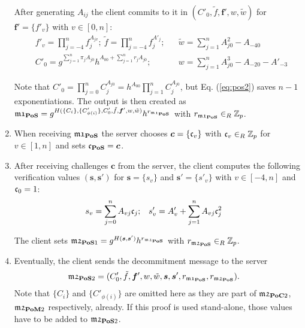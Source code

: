 \begin{enumerate}
    \noindent
    After generating $A_{ij}$ the client commits to it in $(C'_0, \tilde{f}, \bm f', w, \tilde{w})$ for $\bm f'=\{f'_v\}$ with $v\in[0,n]$:
    \begin{align}
    & f'_v=\prod_{j=-4}^{n} f_j^{A_{jv}};~ \tilde{f}=\prod_{j=-4}^{n} f_j^{A'_{j}}; && \tilde{w}=\sum_{j=1}^n A_{j0}^2 - A_{-40} \nonumber\\
    & C'_0=g^{\sum_{j=1}^{n} \pi_j A_{j0}} h^{A_{00}+\sum_{j=1}^{n} r_jA_{j0}}; && w=\sum_{j=1}^n A_{j0}^3-A_{-20}-A'_{-3} \label{eq:pos2}
    \end{align}

    \noindent
    Note that $C'_0=\prod_{j=0}^n C_j^{A_{j0}}=h^{A_{00}}\prod_{j=1}^n C_j^{A_{j0}}$, but Eq. (\ref{eq:pos2}) saves $n-1$ exponentiations.
    The output is then created as
    $\mathfrak{m1}_\mathsf{\bf PoS}=g^{H(\{C_i\}, \{C'_{\phi(i)}\}, C'_0, \tilde{f}, \bm f', w, \tilde{w})} h^{r_{\mathfrak{m1}_\mathsf{\bf PoS}}}$ with $r_{\mathfrak{m1}_\mathsf{\bf PoS}}\in_R\mathbb{Z}_p$.

\item %
    When receiving $\mathfrak{m1}_\mathsf{\bf PoS}$ the server chooses $\bm c = \{\mathfrak{c}_v\}$ with $\mathfrak{c}_v\in_R\mathbb{Z}_p$ for $v\in[1,n]$ and sets $\mathfrak{c}_\mathsf{\bf PoS}=\bm c$.

\item %
    After receiving challenges $\bm c$ from the server, the client computes the following verification values $(\bm s, \bm s')$ for $\bm s = \{s_v\}$ and $\bm s' = \{s'_v\}$ with $v\in[-4,n]$ and $\mathfrak{c}_0=1$:
    \begin{align*}
     & s_v = \sum_{j=0}^{n} A_{vj}\mathfrak{c}_j; && s'_v = A'_v + \sum_{j=1}^{n} A_{vj}\mathfrak{c}_j^2
    \end{align*}

    \noindent
    The client sets $\mathfrak{m2}_{\mathsf{\bf PoS}1}=g^{H(\bm s, \bm s')} h^{r_{\mathfrak{m2}_\mathsf{\bf PoS}}}$ with $r_{\mathfrak{m2}_\mathsf{\bf PoS}}\in_R\mathbb{Z}_p$.

\item %
    Eventually, the client sends the decommitment message to the server
    \begin{align*}
      & \mathfrak{m2}_{\mathsf{\bf PoS}2}=(C'_0, \tilde{f}, \bm f', w, \tilde{w}, \bm s, \bm s', r_{\mathfrak{m1}_\mathsf{\bf PoS}}, r_{\mathfrak{m2}_\mathsf{\bf PoS}}).
    \end{align*}
    Note that $\{C_i\}$ and $\{C'_{\phi(i)}\}$ are omitted here as they are part of $\mathfrak{m2}_{\mathsf{\bf PoC}2}$, $\mathfrak{m2}_{\mathsf{\bf PoM}2}$ respectively, already.
    If this proof is used stand-alone, those values have to be added to $\mathfrak{m2}_{\mathsf{\bf PoS}2}$.

\end{enumerate}

